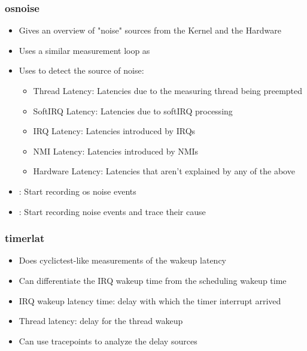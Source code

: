 \begin{frame}
        \frametitle{osnoise}
        \begin{itemize}
                \item Gives an overview of "noise" sources from the Kernel and the Hardware
                \item Uses a similar measurement loop as 
                \item Uses  to detect the source of noise:
                        \begin{itemize}
                                \item Thread Latency: Latencies due to the measuring thread being preempted
                                \item SoftIRQ Latency: Latencies due to softIRQ processing
                                \item IRQ Latency: Latencies introduced by IRQs
                                \item NMI Latency: Latencies introduced by NMIs
                                \item Hardware Latency: Latencies that aren't explained by any of the above
                        \end{itemize}
                \item {}: Start recording os noise events
                \item {}: Start recording noise events and trace their cause
        \end{itemize}
\end{frame}

\begin{frame}
        \frametitle{timerlat}
        \begin{itemize}
                \item Does cyclictest-like measurements of the wakeup latency
                \item Can differentiate the IRQ wakeup time from the scheduling wakeup time
                \item IRQ wakeup latency time: delay with which the timer interrupt arrived
                \item Thread latency: delay for the thread wakeup
                \item Can use  tracepoints to analyze the delay sources
        \end{itemize}
\end{frame}

